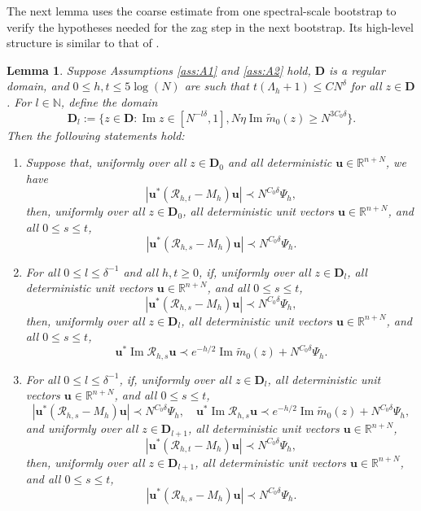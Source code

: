 \documentclass[11pt,reqno]{amsart}
\def\R{\mathbb{R}}
\def\u{\mathbf{u}}
\def\N{\mathbb{N}}
\def\cR{\mathcal{R}}
\def\bD{\mathbf{D}}
\def\Im{\operatorname{Im}}
\newtheorem{lemma}[theorem]{Lemma}
\theoremstyle{definition}
\numberwithin{equation}{section}
\numberwithin{figure}{section}
\begin{document}
The next lemma uses the coarse estimate from one spectral-scale bootstrap to verify the hypotheses needed for the zag step in the next bootstrap. Its high-level structure is similar to that of \cite[Lemma~4.12]{fan2026anisotropic}.
\begin{lemma}\label{lem:bootstrap-in-zag}
Suppose Assumptions \ref{ass:A1} and \ref{ass:A2} hold, $\bD$ is a regular domain, and $0\leq h,t\leq 5\log(N)$ are such that $t(\Lambda_h+1)\leq CN^\delta$ for all $z\in\bD$. For $l\in\N$, define the domain
\[
    \bD_l:=\{z\in\bD:\Im z\in[N^{-l\delta},1],N\eta\Im\widetilde m_0(z)\geq N^{3C_0\delta}\}.
\]
Then the following statements hold:
\begin{enumerate}[label=(\alph*)]
    \item Suppose that, uniformly over all $z\in\bD_0$ and all deterministic $\u\in\R^{n+N}$, we have
    \[
        |\u^*(\cR_{h,t}-M_h)\u|\prec N^{C_0\delta}\Psi_h,
    \]
    then, uniformly over all $z\in\bD_0$, all deterministic unit vectors $\u\in\R^{n+N}$, and all $0\leq s\le t$,
    \[
        |\u^*(\cR_{h,s}-M_h)\u|\prec N^{C_0\delta}\Psi_h.
    \]
    \item For all $0\leq l\leq \delta^{-1}$ and all $h,t\geq 0$, if, uniformly over all $z\in\bD_l$, all deterministic unit vectors $\u\in\R^{n+N}$, and all $0\leq s\leq t$,
    \[
        |\u^*(\cR_{h,s}-M_h)\u|\prec N^{C_0\delta}\Psi_h,
    \]
    then, uniformly over all $z\in\bD_l$, all deterministic unit vectors $\u\in\R^{n+N}$, and all $0\leq s\leq t$,
    \[
        \u^*\Im\cR_{h,s}\u\prec e^{-h/2}\Im\widetilde m_0(z)+N^{C_0\delta}\Psi_h.
    \]
    \item For all $0\leq l\leq \delta^{-1}$, if, uniformly over all $z\in\bD_l$, all deterministic unit vectors $\u\in\R^{n+N}$, and all $0\leq s\leq t$,
    \[
        |\u^*(\cR_{h,s}-M_h)\u|\prec N^{C_0\delta}\Psi_h,\quad \u^*\Im\cR_{h,s}\u\prec e^{-h/2}\Im\widetilde m_0(z)+N^{C_0\delta}\Psi_h,
    \]
    and uniformly over all $z\in\bD_{l+1}$, all deterministic unit vectors $\u\in\R^{n+N}$,
    \[
        |\u^*(\cR_{h,t}-M_h)\u|\prec N^{C_0\delta}\Psi_h,
    \]
    then, uniformly over all $z\in\bD_{l+1}$, all deterministic unit vectors $\u\in\R^{n+N}$, and all $0\leq s\leq t$,
    \[
        |\u^*(\cR_{h,s}-M_h)\u|\prec N^{C_0\delta}\Psi_h.
    \]
\end{enumerate}
\end{lemma}
\end{document}
